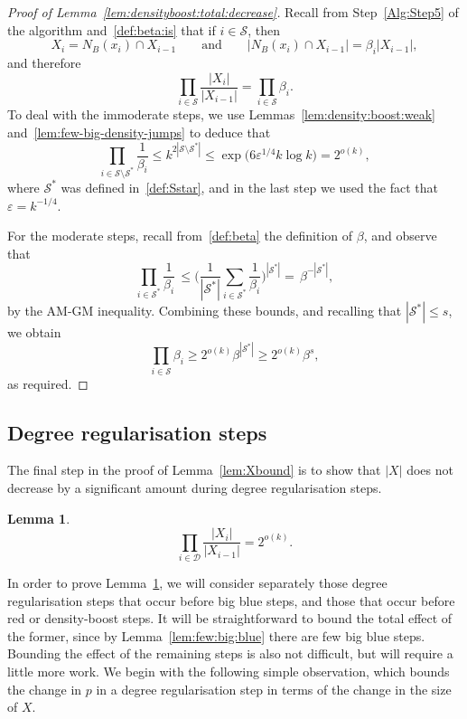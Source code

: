 \documentclass[12pt,reqno]{amsart}
\newtheorem{lemma}[theorem]{Lemma}
\theoremstyle{definition}
\theoremstyle{remark}
\def\cS{\mathcal{S}}
\newcommand\eps{\varepsilon}
\renewcommand{\le}{\leqslant}
\renewcommand{\ge}{\geqslant}
\def\eps{\varepsilon}
\def\cD{\mathcal{D}}
\begin{document}
\begin{proof}[Proof of Lemma~\ref{lem:densityboost:total:decrease}]
Recall from Step~\ref{Alg:Step5} of the algorithm and~\eqref{def:beta:is} that if $i \in \cS$, then 
$$X_i = N_B(x_i) \cap X_{i-1} \qquad \text{and} \qquad |N_B(x_i) \cap X_{i-1}| = \beta_i |X_{i-1}|,$$
and therefore
$$\prod_{i \in \cS} \frac{|X_i|}{|X_{i-1}|} = \prod_{i \in \cS} \beta_i.$$
To deal with the immoderate steps, we use Lemmas~\ref{lem:density:boost:weak} and~\ref{lem:few-big-density-jumps} to deduce that
$$\prod_{i \in \cS \setminus \cS^*} \frac{1}{\beta_i} \le k^{2 |\cS \setminus \cS^*|} \le \exp\Big( 6 \eps^{1/4} k \log k \Big) = 2^{o(k)},$$
where $\cS^*$ was defined in~\eqref{def:Sstar}, and in the last step we used the fact that $\eps = k^{-1/4}$. 

For the moderate steps, recall from~\eqref{def:beta} the definition of $\beta$, and observe that
$$\prod_{i \in \cS^*} \frac{1}{\beta_i} \, \le \bigg( \frac{1}{|\cS^*|} \sum_{i \in \cS^*} \frac{1}{\beta_i} \bigg)^{|\cS^*|} = \, \beta^{-|\cS^*|},$$
by the AM-GM inequality. Combining these bounds, and recalling that $|\cS^*| \le s$, we obtain
$$\prod_{i \in \cS} \beta_i \ge 2^{o(k)} \beta^{|\cS^*|} \ge 2^{o(k)} \beta^s,$$
as required.
\end{proof}


\subsection{Degree regularisation steps}\label{regularisation:step}

The final step in the proof of Lemma~\ref{lem:Xbound} is to show that $|X|$ does not decrease by a significant amount during degree regularisation steps. 

\begin{lemma}\label{lem:degree:total:decrease}
$$\prod_{i \in \cD} \frac{|X_i|}{|X_{i-1}|} = 2^{o(k)}.$$
\end{lemma}

In order to prove Lemma~\ref{lem:degree:total:decrease}, we will consider separately those degree regularisation steps that occur before big blue steps, and those that occur before red or density-boost steps. It will be straightforward to bound the total effect of the former, since by Lemma~\ref{lem:few:big:blue} there are few big blue steps. Bounding the effect of the remaining steps is also not difficult, but will require a little more work. We begin with the following simple observation, which bounds the change in $p$ in a degree regularisation step in terms of the change in the size of $X$.
\end{document}

